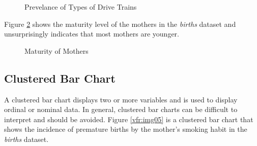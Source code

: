 \begin{figure}[H]
  \begin{center}
    \caption{Prevelance of Types of Drive Trains}
    \label{vfr:img03}
  \end{center}
\end{figure}

Figure \ref{vfr:img04} shows the maturity level of the mothers in the \textit{births} dataset and unsurprisingly indicates that most mothers are younger.

\begin{figure}[H]
  \begin{center}
    \caption{Maturity of Mothers}
    \label{vfr:img04}
  \end{center}
\end{figure}

\subsection{Clustered Bar Chart} A clustered bar chart displays two or more variables and is used to display ordinal or nominal data. In general, clustered bar charts can be difficult to interpret and should be avoided. Figure \ref{vfr:img05} is a clustered bar chart that shows the incidence of premature births by the mother's smoking habit in the \textit{births} dataset.

